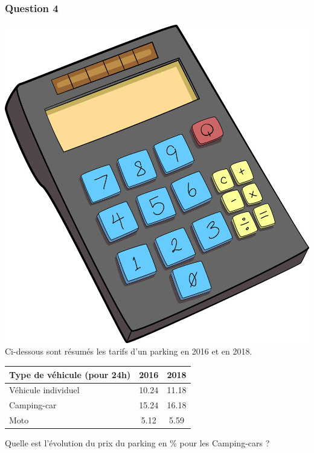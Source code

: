 \documentclass[15pt, mathserif]{beamer}
\begin{document}
\begin{frame} 
	\frametitle{Question 4}
\includegraphics[scale=0.01]{calculatrice}Ci-dessous sont résumés les tarifs d'un parking en 2016 et en 2018. 
 \begin{center} 
 \begin{tabular}{|C{3cm}|c|c|} 
 \hline 
 Type de véhicule (pour 24h) & 2016 & 2018 \\ 
 \hline 
 Véhicule individuel & 10.24& 11.18\\ 
 \hline 
 Camping-car & 15.24& 16.18\\ 
 \hline 
 Moto & 5.12& 5.59\\ 
 \hline 
 \end{tabular} 
\end{center} 
  Quelle est l'évolution du prix du parking en \% pour les Camping-cars ?\end{frame}
\end{document}
